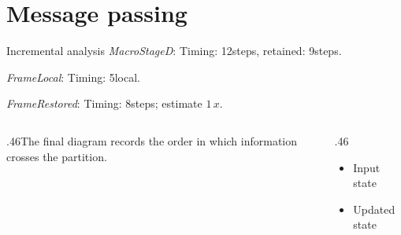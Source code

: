 \documentclass[11pt,aspectratio=43]{beamer}
\newcommand{\fuzzlayerA}[1]{\textit{#1}}
\newcommand{\fuzzterm}[1]{\fuzzlayerA{#1}}
\newcommand{\fuzzpair}[2]{\fuzzterm{#1}: #2}
\newcommand{\fuzzunit}{steps}
\let\fuzzoriginalunit\fuzzunit
\newcommand{\fuzzcoefficient}{1}
\newcommand{\fuzzscale}[2][\fuzzcoefficient]{#1\,#2}
\begin{document}
\section{Message passing}
\begin{frame}[t]{Incremental analysis}
\fuzzpair{MacroStageD}{Timing: 12\fuzzunit, retained: 9\fuzzoriginalunit.}\par
{\renewcommand{\fuzzunit}{local}\fuzzpair{FrameLocal}{Timing: 5\fuzzunit.}\par}
\fuzzpair{FrameRestored}{Timing: 8\fuzzunit; estimate $\fuzzscale{x}$.}\par
\begin{columns}[T]\begin{column}{.46\textwidth}The final diagram records the order in which information crosses the partition.\end{column}\begin{column}{.46\textwidth}\begin{itemize}\item Input state\item Updated state\end{itemize}\end{column}\end{columns}
\end{frame}
\end{document}
